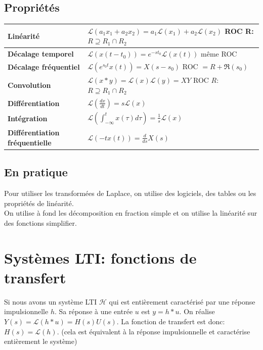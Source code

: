 \documentclass{report}
\begin{document}
\subsection{Propriétés}

\begin{center}
\begin{tabular}{|m{3cm}|m{7cm}|}
\hline
\textbf{Linéarité} & $\mathcal{L}(a_1 x_1 + a_2 x_2) = a_1 \mathcal{L}(x_1) + a_2 \mathcal{L}(x_2)$ \newline  ROC R: $R \supseteq R_1 \cap R_2$ \\
\hline
\textbf{Décalage temporel} & $\mathcal{L}(x(t-t_0)) = e^{-s t_0} \mathcal{L}(x(t))$ \newline même ROC\\
\hline
\textbf{Décalage fréquentiel} & $\mathcal{L}(e^{s_0 t}x(t)) = X(s-s_0)$ \newline ROC $= R + \mathfrak{R}(s_0)$\\
\hline
\textbf{Convolution} & $\mathcal{L}(x \ast y) = \mathcal{L}(x) \mathcal{L}(y) = XY$ \newline ROC $R$: $R \supseteq R_1 \cap R_2$\\
\hline
\textbf{Différentiation} & $\mathcal{L} \left( \frac{dx}{dt} \right) = s \mathcal{L}(x)$\\
\hline
\textbf{Intégration} & $\mathcal{L} \left( \int_{-\infty}^t x( \tau ) d \tau \right) = \frac{1}{s} \mathcal{L}(x)$\\
\hline
\textbf{Différentiation fréquentielle} & $\mathcal{L}(-tx(t)) = \frac{d}{ds} X(s)$\\
\hline
\end{tabular}
\end{center}
\subsection{En pratique}
Pour utiliser les transformées de Laplace, on utilise des logiciels, des tables ou les propriétés de linéarité.\\
On utilise à fond les décomposition en fraction simple et on utilise la linéarité sur des fonctions simplifier.

\section{Systèmes LTI: fonctions de transfert}
Si nous avons un système LTI $\mathcal{H}$ qui est entièrement caractérisé par une réponse impulsionnelle $h$. Sa réponse à une entrée $u$ est $y = h \ast u$. On réalise $Y(s) = \mathcal{L}(h \ast u) = H(s) U(s)$. La fonction de transfert est donc: \textbf{$H(s) = \mathcal{L}(h)$}. (cela est équivalent à la réponse impulsionnelle et caractérise entièrement le système)
\end{document}
